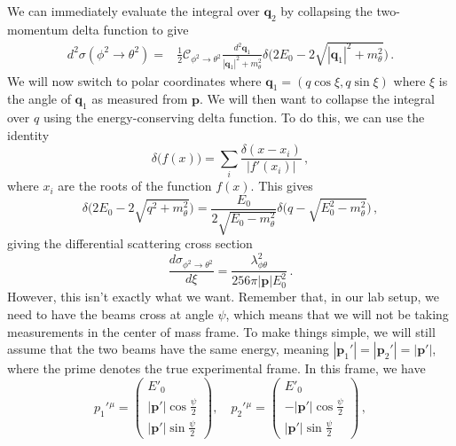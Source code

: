 \documentclass{article}
\numberwithin{equation}{subsection}
\begin{document}
We can immediately evaluate the integral over $\mathbf{q}_2$ by collapsing the two-momentum delta function to give
\begin{equation}\begin{split}
	d^2\sigma(\phi^2\to\theta^2) =& \frac{1}{2}\mathcal{C}_{\phi^2\to\theta^2}\frac{d^2\mathbf{q}_1}{|\mathbf{q}_1|^2 + m_\theta^2}
		\delta\Big(2 E_0 - 2\sqrt{|\mathbf{q}_1|^2 + m_\theta^2}\Big)\,.
\end{split}\end{equation}
We will now switch to polar coordinates where $\mathbf{q}_1 = (q\cos\xi,q\sin\xi)$ where $\xi$ is the angle of $\mathbf{q}_1$ as measured from $\mathbf{p}$. We
will then want to collapse the integral over $q$ using the energy-conserving delta function. To do this, we can use the identity
\begin{equation}
	\delta\big(f(x)\big) = \sum_i\frac{\delta(x - x_i)}{|f'(x_i)|}\,,
\end{equation}
where $x_i$ are the roots of the function $f(x)$. This gives
\begin{equation}
	\delta\Big(2 E_0 - 2\sqrt{q^2 + m_\theta^2}\Big) = \frac{E_0}{2\sqrt{E_0 - m_\theta^2}}\delta\Big(q - \sqrt{E_0^2 - m_\theta^2}\Big)\,,
\end{equation}
giving the differential scattering cross section
\begin{equation}\label{eq:comxseclo}
	\frac{d\sigma_{\phi^2\to\theta^2}}{d\xi} = \frac{\lambda_{\phi\theta}^2}{256\pi|\mathbf{p}|E_0^2}\,.
\end{equation}
However, this isn't exactly what we want. Remember that, in our lab setup, we need to have the beams cross at angle $\psi$, which means that we will not
be taking measurements in the center of mass frame. To make things simple, we will still assume that the two beams have the same energy, meaning
$|\mathbf{p}_1'| = |\mathbf{p}_2'| = |\mathbf{p}'|$, where the prime denotes the true experimental frame. In this frame, we have
\begin{equation}
	{p_1'}{}^\mu = \begin{pmatrix}
		E'_0\\
		|\mathbf{p}'|\cos\frac{\psi}{2} \\
		|\mathbf{p}'|\sin\frac{\psi}{2}
	\end{pmatrix}, \quad
	{p_2'}{}^\mu = \begin{pmatrix}
		E'_0\\
		-|\mathbf{p}'|\cos\frac{\psi}{2} \\
		|\mathbf{p}'|\sin\frac{\psi}{2}
	\end{pmatrix}\,,
\end{equation}
\end{document}
